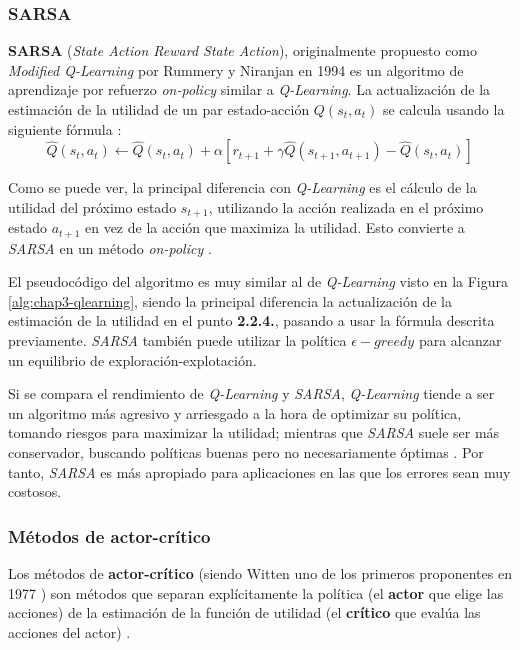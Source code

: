 \subsubsection{SARSA}

\textbf{SARSA} (\textit{State Action Reward State Action}), originalmente propuesto como \textit{Modified Q-Learning} por Rummery y Niranjan en 1994 \cite{sarsa} es un algoritmo de aprendizaje por refuerzo \textit{on-policy} similar a \textit{Q-Learning}. La actualización de la estimación de la utilidad de un par estado-acción $Q(s_t,a_t)$ se calcula usando la siguiente fórmula \cite{Sutton1998}:
\[\hat{Q}(s_t,a_t) \leftarrow \hat{Q}(s_t,a_t) + \alpha [r_{t+1} + \gamma \hat{Q}(s_{t+1},a_{t+1}) - \hat{Q}(s_t,a_t)]\]

Como se puede ver, la principal diferencia con \textit{Q-Learning} es el cálculo de la utilidad del próximo estado $s_{t+1}$, utilizando la acción realizada en el próximo estado $a_{t+1}$ en vez de la acción que maximiza la utilidad. Esto convierte a \textit{SARSA} en un método \textit{on-policy} \cite{Sutton1998}.

El pseudocódigo del algoritmo es muy similar al de \textit{Q-Learning} visto en la Figura \ref{alg:chap3-qlearning}, siendo la principal diferencia la actualización de la estimación de la utilidad en el punto \textbf{2.2.4.}, pasando a usar la fórmula descrita previamente. \textit{SARSA} también puede utilizar la política $\epsilon-greedy$ para alcanzar un equilibrio de exploración-explotación.

Si se compara el rendimiento de \textit{Q-Learning} y \textit{SARSA}, \textit{Q-Learning} tiende a ser un algoritmo más agresivo y arriesgado a la hora de optimizar su política, tomando riesgos para maximizar la utilidad; mientras que \textit{SARSA} suele ser más conservador, buscando políticas buenas pero no necesariamente óptimas \cite{Sutton1998}. Por tanto, \textit{SARSA} es más apropiado para aplicaciones en las que los errores sean muy costosos.

\subsubsection{Métodos de actor-crítico}

Los métodos de \textbf{actor-crítico} (siendo Witten uno de los primeros proponentes en 1977 \cite{Witten1977AnAO}) son métodos que separan explícitamente la política (el \textbf{actor} que elige las acciones) de la estimación de la función de utilidad (el \textbf{crítico} que evalúa las acciones del actor) \cite{Sutton1998}.

